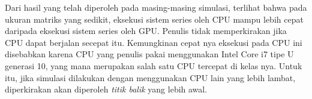 Dari hasil yang telah diperoleh pada masing-masing simulasi, terlihat bahwa pada ukuran matriks yang sedikit, eksekusi sistem series oleh CPU mampu lebih cepat daripada eksekusi sistem series oleh GPU. Penulis tidak memperkirakan jika CPU dapat berjalan secepat itu. Kemungkinan cepat nya eksekusi pada CPU ini disebabkan karena CPU yang penulis pakai menggunakan Intel Core i7 tipe U generasi 10, yang mana merupakan salah satu CPU tercepat di kelas nya. Untuk itu, jika simulasi dilakukan dengan menggunakan CPU lain yang lebih lambat, diperkirakan akan diperoleh \emph{titik balik} yang lebih awal.


%
